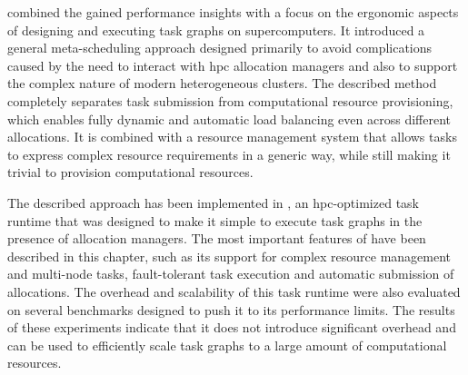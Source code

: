  combined the gained performance insights with a focus on
the ergonomic aspects of designing and executing task graphs on supercomputers. It introduced a
general meta-scheduling approach designed primarily to avoid complications caused by the need to
interact with \gls{hpc} allocation managers and also to support the complex nature
of modern heterogeneous clusters. The described method completely separates task submission from
computational resource provisioning, which enables fully dynamic and automatic load balancing even
across different allocations. It is combined with a resource management system that allows tasks to
express complex resource requirements in a generic way, while still making it trivial to provision
computational resources.

The described approach has been implemented in \hyperqueue{}, an
\gls{hpc}-optimized task runtime that was designed to make it simple to execute
task graphs in the presence of allocation managers. The most important features of
\hyperqueue{} have been described in this chapter, such as its support for complex
resource management and multi-node tasks, fault-tolerant task execution and automatic submission of
allocations. The overhead and scalability of this task runtime were also evaluated on several
benchmarks designed to push it to its performance limits. The results of these experiments indicate
that it does not introduce significant overhead and can be used to efficiently scale task graphs to
a large amount of computational resources.

